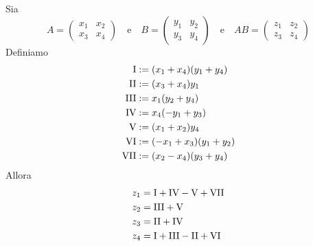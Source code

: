 \documentclass[../main.tex]{subfiles}
\begin{document}
\begin{definition}
    Sia
    \begin{equation*}
        A = \begin{pmatrix} x_1 & x_2 \\ x_3 & x_4 \end{pmatrix} \quad \text{e} \quad B = \begin{pmatrix} y_1 & y_2 \\ y_3 & y_4 \end{pmatrix} \quad \text{e} \quad AB = \begin{pmatrix} z_1 & z_2 \\ z_3 & z_4 \end{pmatrix}
    \end{equation*}
    Definiamo
    \begin{align*}
        \Roman 1 & := (x_1 + x_4)(y_1 + y_4)  \\
        \Roman 2 & := (x_3 + x_4)y_1          \\
        \Roman 3 & := x_1(y_2 + y_4)          \\
        \Roman 4 & := x_4(-y_1 + y_3)         \\
        \Roman 5 & := (x_1 + x_2)y_4          \\
        \Roman 6 & := (-x_1 + x_3)(y_1 + y_2) \\
        \Roman 7 & := (x_2 - x_4)(y_3 + y_4)
    \end{align*}
    Allora
    \begin{align*}
        z_1 & = \Roman 1 + \Roman 4 - \Roman 5 + \Roman 7 \\
        z_2 & = \Roman 3 + \Roman 5                       \\
        z_3 & = \Roman 2 + \Roman 4                       \\
        z_4 & = \Roman 1 + \Roman 3 - \Roman 2 + \Roman 6
    \end{align*}
\end{definition}
\end{document}
